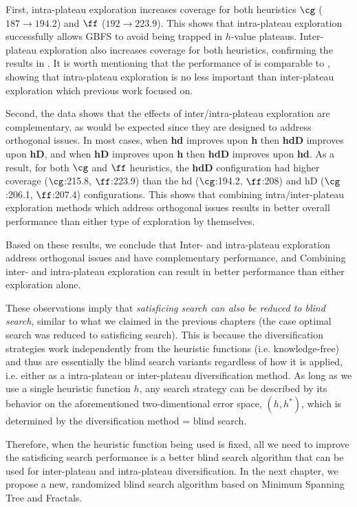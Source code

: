% 


First, 
% 
intra-plateau exploration  increases coverage for both heuristics
$\cg$ ($187 \rightarrow 194.2$) and $\ff$ ($192 \rightarrow 223.9$).
This shows that intra-plateau exploration successfully allows GBFS to avoid being trapped in $h$-value plateaus.
Inter-plateau exploration  also increases coverage for both heuristics, confirming the results in \cite{xie14type}.
It is worth mentioning that the performance of  is comparable to , showing that intra-plateau exploration is no less important than inter-plateau exploration which previous work focused on.

Second, the data shows that the effects of inter/intra-plateau exploration are complementary, 
as would be expected since they are designed to address orthogonal issues.
In most cases,
when \textbf{hd} improves upon \textbf{h} then \textbf{hdD} improves upon \textbf{hD},
and when \textbf{hD} improves upon \textbf{h} then \textbf{hdD} improves upon \textbf{hd}.
As a result, for both $\cg$ and $\ff$ heuristics, the \textbf{hdD} configuration had higher coverage ($\cg$:215.8, $\ff$:223.9) than the hd ($\cg$:194.2, $\ff$:208) and hD ($\cg$:206.1, $\ff$:207.4) configurations. 
This shows that combining intra/inter-plateau exploration methods which address orthogonal issues results in better overall performance than either type of exploration by themselves.

Based on these results, we conclude that
Inter- and intra-plateau exploration address orthogonal issues and have complementary performance, and
Combining inter- and intra-plateau exploration can result in better performance than either exploration alone.

These observations imply that
\emph{satisficing search can also be reduced to blind search}, similar
to what we claimed in the previous chapters (the case optimal search was reduced to satisficing search).
This is because the diversification strategies work independently from the heuristic functions (i.e. knowledge-free)
and thus are essentially the blind search variants regardless of how it is applied, i.e. either as a intra-plateau or inter-plateau diversification method.
As long as we use a single heuristic function $h$, any search strategy can be described
by its behavior on the aforementioned two-dimentional error space, $(h,h^*)$,
which is determined by the diversification method = blind search.

Therefore, when the heuristic function being used is fixed,
all we need to improve the satisficing search performance is a better blind
search algorithm that can be used for inter-plateau and intra-plateau diversification.
In the next chapter, we propose a new, randomized
blind search algorithm based on Minimum Spanning Tree and Fractals.
